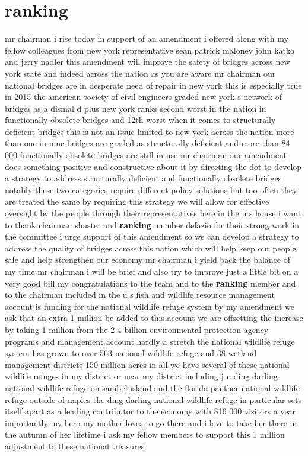 \documentclass{article}
\begin{document}
\section*{ranking}
mr chairman i rise today in support of an amendment i offered along with my fellow colleagues from new york representative sean patrick maloney john katko and jerry nadler this amendment will improve the safety of bridges across new york state and indeed across the nation as you are aware mr chairman our national bridges are in desperate need of repair in new york this is especially true in 2015 the american society of civil engineers graded new york s network of bridges as a dismal d plus new york ranks second worst in the nation in functionally obsolete bridges and 12th worst when it comes to structurally deficient bridges this is not an issue limited to new york across the nation more than one in nine bridges are graded as structurally deficient and more than 84 000 functionally obsolete bridges are still in use mr chairman our amendment does something positive and constructive about it by directing the dot to develop a strategy to address structurally deficient and functionally obsolete bridges notably these two categories require different policy solutions but too often they are treated the same by requiring this strategy we will allow for effective oversight by the people through their representatives here in the u s house i want to thank chairman shuster and {\bf \color{red} ranking} member defazio for their strong work in the committee i urge support of this amendment so we can develop a strategy to address the quality of bridges across this nation which will help keep our people safe and help strengthen our economy mr chairman i yield back the balance of my time
\vspace{8mm}
mr chairman i will be brief and also try to improve just a little bit on a very good bill my congratulations to the team and to the {\bf \color{red} ranking} member and to the chairman included in the u s fish and wildlife resource management account is funding for the national wildlife refuge system by my amendment we ask that an extra 1 million be added to this account we are offsetting the increase by taking 1 million from the 2 4 billion environmental protection agency programs and management account hardly a stretch the national wildlife refuge system has grown to over 563 national wildlife refuge and 38 wetland management districts 150 million acres in all we have several of these national wildlife refuges in my district or near my district including j n ding darling national wildlife refuge on sanibel island and the florida panther national wildlife refuge outside of naples the ding darling national wildlife refuge in particular sets itself apart as a leading contributor to the economy with 816 000 visitors a year importantly my hero my mother loves to go there and i love to take her there in the autumn of her lifetime i ask my fellow members to support this 1 million adjustment to these national treasures
\end{document}
